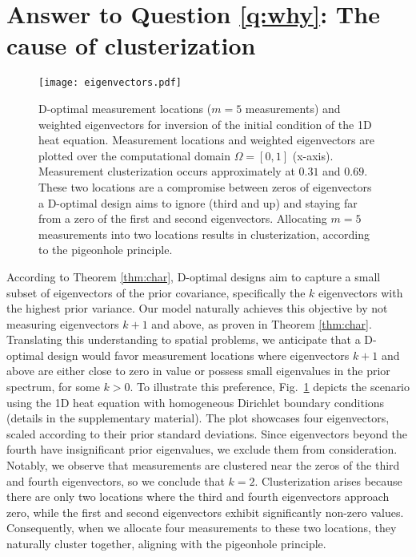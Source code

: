 \section{Answer to Question \ref{q:why}: The cause of clusterization}\label{section:why}
\begin{figure}
    \centering
    \texttt{[image: eigenvectors.pdf]}
    \caption{D-optimal measurement locations ($m=5$ measurements) and
      weighted eigenvectors for inversion of the initial condition of
      the 1D heat equation. Measurement locations and weighted
      eigenvectors are plotted over the computational domain $\Omega =
      [0, 1]$ (x-axis). Measurement clusterization occurs
      approximately at $0.31$ and $0.69$. These two locations are a
      compromise between zeros of eigenvectors a D-optimal design aims
      to ignore (third and up) and staying far from a zero of the
      first and second eigenvectors. Allocating $m=5$ measurements
      into two locations results in clusterization, according to the
      pigeonhole principle.}
  \label{fig:why}
\end{figure}


According to Theorem \ref{thm:char}, D-optimal designs aim to capture
a small subset of eigenvectors of the prior covariance, specifically
the $k$ eigenvectors with the highest prior variance. Our model
naturally achieves this objective by not measuring eigenvectors $k+1$
and above, as proven in Theorem \ref{thm:char}. Translating this
understanding to spatial problems, we anticipate that a D-optimal
design would favor measurement locations where eigenvectors $k+1$ and
above are either close to zero in value or possess small eigenvalues
in the prior spectrum, for some $k > 0$. To illustrate this
preference, Fig.~\ref{fig:why} depicts the scenario using the 1D
heat equation with homogeneous Dirichlet boundary conditions (details
in the supplementary material). The plot showcases four eigenvectors,
scaled according to their prior standard deviations. Since
eigenvectors beyond the fourth have insignificant prior eigenvalues,
we exclude them from consideration. Notably, we observe that
measurements are clustered near the zeros of the third and fourth
eigenvectors, so we conclude that $k=2$. Clusterization arises because
there are only two locations where the third and fourth eigenvectors
approach zero, while the first and second eigenvectors exhibit
significantly non-zero values. Consequently, when we allocate four
measurements to these two locations, they naturally cluster together,
aligning with the pigeonhole principle.
